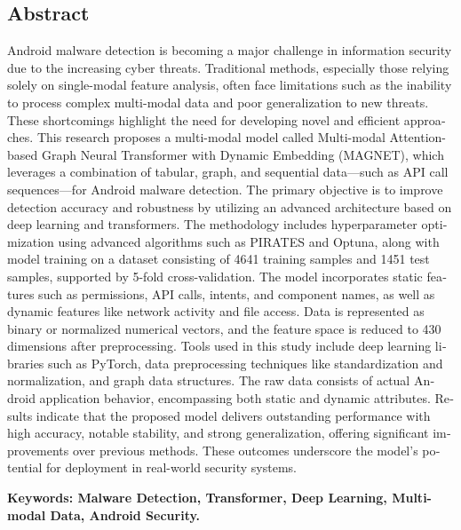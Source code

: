 \documentclass[a4paper,oneside,12pt]{report}
\theoremstyle{definition}
\begin{document}
\newpage
\begin{latin}
\section*{\fontsize{16}{17}\selectfont \bfseries Abstract}
\setlength{\parindent}{0pt}\fontsize{12}{13}\selectfont
Android malware detection is becoming a major challenge in information security due to the increasing cyber threats. Traditional methods, especially those relying solely on single-modal feature analysis, often face limitations such as the inability to process complex multi-modal data and poor generalization to new threats. These shortcomings highlight the need for developing novel and efficient approaches. This research proposes a multi-modal model called Multi-modal Attention-based Graph Neural Transformer with Dynamic Embedding (MAGNET), which leverages a combination of tabular, graph, and sequential data—such as API call sequences—for Android malware detection. The primary objective is to improve detection accuracy and robustness by utilizing an advanced architecture based on deep learning and transformers. The methodology includes hyperparameter optimization using advanced algorithms such as PIRATES and Optuna, along with model training on a dataset consisting of 4641 training samples and 1451 test samples, supported by 5-fold cross-validation. The model incorporates static features such as permissions, API calls, intents, and component names, as well as dynamic features like network activity and file access. Data is represented as binary or normalized numerical vectors, and the feature space is reduced to 430 dimensions after preprocessing. Tools used in this study include deep learning libraries such as PyTorch, data preprocessing techniques like standardization and normalization, and graph data structures. The raw data consists of actual Android application behavior, encompassing both static and dynamic attributes. Results indicate that the proposed model delivers outstanding performance with high accuracy, notable stability, and strong generalization, offering significant improvements over previous methods. These outcomes underscore the model's potential for deployment in real-world security systems.

\par\vspace{.5cm}\setlength{\parindent}{0pt}
{\fontsize{13}{14}\selectfont\bfseries Keywords: Malware Detection, Transformer, Deep Learning, Multi-modal Data, Android Security.}
\end{latin}
\end{document}
